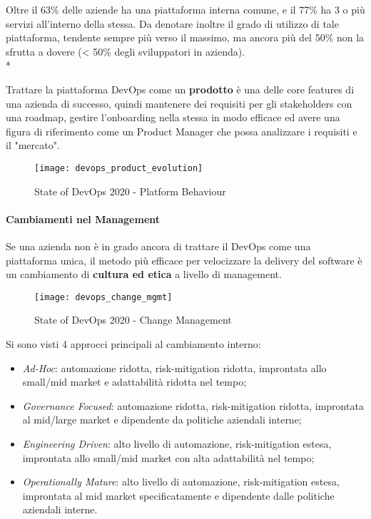 \documentclass[../main.tex]{subfiles}
\begin{document}
            Oltre il 63\% delle aziende ha una piattaforma interna comune, e il 77\% ha 3 o più servizi all'interno della stessa. Da denotare inoltre il grado di utilizzo di tale piattaforma, tendente sempre più verso il massimo, ma ancora più del 50\% non la sfrutta a dovere (< 50\% degli sviluppatori in azienda).\\*
            
            Trattare la piattaforma DevOps come un \textbf{prodotto} è una delle core features di una azienda di successo, quindi mantenere dei requisiti per gli stakeholders con una roadmap, gestire l'onboarding nella stessa in modo efficace ed avere una figura di riferimento come un Product Manager che possa analizzare i requisiti e il "mercato".
            
            \begin{figure}[h]
        		\centering
        		\texttt{[image: devops\_product\_evolution]}
        		\caption{State of DevOps 2020 - Platform Behaviour}
        		\label{fig:devops_product_evolution}
        	\end{figure}
            
            \paragraph{Cambiamenti nel Management}
            Se una azienda non è in grado ancora di trattare il DevOps come una piattaforma unica, il metodo più efficace per velocizzare la delivery del software è un cambiamento di \textbf{cultura ed etica} a livello di management.
            
            \begin{figure}[h]
        		\centering
        		\texttt{[image: devops\_change\_mgmt]}
        		\caption{State of DevOps 2020 - Change Management}
        		\label{fig:devops_change_mgmt}
        	\end{figure}
            
            Si sono visti 4 approcci principali al cambiamento interno:
            \begin{itemize}
                \item \emph{Ad-Hoc}: automazione ridotta, risk-mitigation ridotta, improntata allo small/mid market e adattabilità ridotta nel tempo;
                \item \emph{Governance Focused}: automazione ridotta, risk-mitigation ridotta, improntata al mid/large market e dipendente da politiche aziendali interne;
                \item \emph{Engineering Driven}: alto livello di automazione, risk-mitigation estesa, improntata allo small/mid market con alta adattabilità nel tempo;
                \item \emph{Operationally Mature}: alto livello di automazione, risk-mitigation estesa, improntata al mid market specificatamente e dipendente dalle politiche aziendali interne.
            \end{itemize}
        
\end{document}
